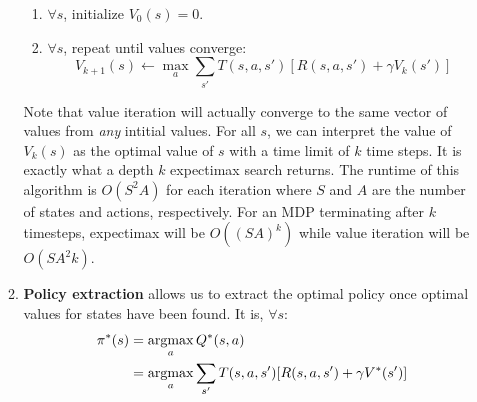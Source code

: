\documentclass[10pt]{article}
\newcommand{\argmax}{\operatornamewithlimits{argmax}}
\begin{document}
\begin{multicols}{2}
\begin{enumerate}
\begin{enumerate}
            \begin{enumerate}
                \item $\forall s$, initialize $V_0(s)=0$.
                \item $\forall s$, repeat until values converge:
                $$V_{k+1}(s) \leftarrow \max_{a}\sum_{s'} T(s,a,s') [R(s,a,s')+\gamma V_k(s')]$$
            \end{enumerate}
            Note that value iteration will actually converge to the same vector of values from \textit{any} intitial values.
            For all $s$, we can interpret the value of $V_{k}(s)$ as the optimal value of $s$ with a time limit of $k$ time steps. It is exactly what a depth $k$ expectimax search returns. The runtime of this algorithm is $O(S^2A)$ for each iteration where $S$ and $A$ are the number of states and actions, respectively. For an MDP terminating after $k$ timesteps, expectimax will be $O((SA)^k)$ while value iteration will be $O(SA^2k)$.
            \item \textbf{Policy extraction} allows us to extract the optimal policy once optimal values for states have been found. It is, $\forall s$:
            \begin{align*}
\pi^*(s)&=\argmax_{a} Q^*(s,a) \\ &=\argmax_a \sum_{s'} T(s,a,s') [R(s,a,s')+\gamma V^*(s')]
            \end{align*}
        

\end{enumerate}
\end{enumerate}
\end{multicols}
\end{document}
